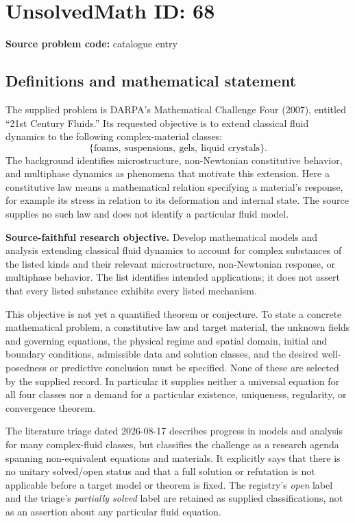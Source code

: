 \documentclass[11pt]{article}
\begin{document}
\section*{UnsolvedMath ID: 68}
\textbf{Source problem code:} catalogue entry
\subsection{Definitions and mathematical statement}
The supplied problem is DARPA's Mathematical Challenge Four (2007), entitled ``21st Century Fluids.'' Its requested objective is to extend classical fluid dynamics to the following complex-material classes:
\[
\{\text{foams},\ \text{suspensions},\ \text{gels},\ \text{liquid crystals}\}.
\]
The background identifies microstructure, non-Newtonian constitutive behavior, and multiphase dynamics as phenomena that motivate this extension. Here a constitutive law means a mathematical relation specifying a material's response, for example its stress in relation to its deformation and internal state. The source supplies no such law and does not identify a particular fluid model.

\textbf{Source-faithful research objective.} Develop mathematical models and analysis extending classical fluid dynamics to account for complex substances of the listed kinds and their relevant microstructure, non-Newtonian response, or multiphase behavior. The list identifies intended applications; it does not assert that every listed substance exhibits every listed mechanism.

This objective is not yet a quantified theorem or conjecture. To state a concrete mathematical problem, a constitutive law and target material, the unknown fields and governing equations, the physical regime and spatial domain, initial and boundary conditions, admissible data and solution classes, and the desired well-posedness or predictive conclusion must be specified. None of these are selected by the supplied record. In particular it supplies neither a universal equation for all four classes nor a demand for a particular existence, uniqueness, regularity, or convergence theorem.

The literature triage dated 2026-08-17 describes progress in models and analysis for many complex-fluid classes, but classifies the challenge as a research agenda spanning non-equivalent equations and materials. It explicitly says that there is no unitary solved/open status and that a full solution or refutation is not applicable before a target model or theorem is fixed. The registry's \emph{open} label and the triage's \emph{partially solved} label are retained as supplied classifications, not as an assertion about any particular fluid equation.
\end{document}
